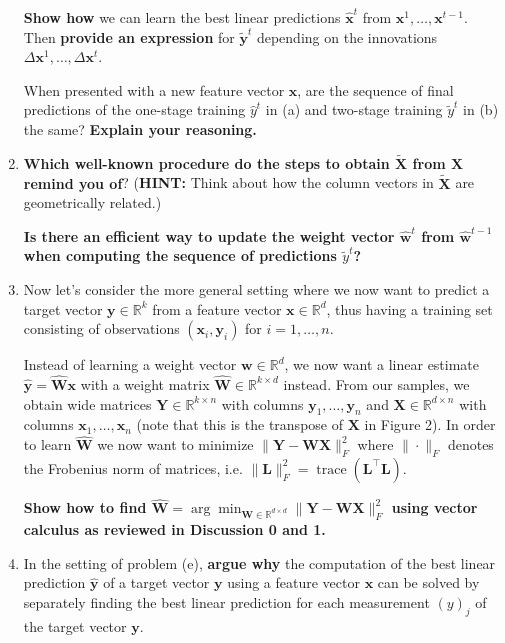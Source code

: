 \documentclass{article}\usepackage[utf8]{inputenc}\usepackage[margin=0.4cm,top=0.4cm,bottom=0.4cm]{geometry}\usepackage[usenames,dvipsnames,svgnames,table]{xcolor}
\begin{document}
\begin{enumerate}
\textbf{Show how} we can learn the best linear predictions $\hat{\mathbf{x}}^t$ from $\mathbf{x}^1,\ldots, \mathbf{x}^{t-1}$. Then \textbf{provide an expression} for $\tilde{\mathbf{y}}^t$ depending on the innovations $\Delta\mathbf{x}^1,\dots, \Delta\mathbf{x}^{t}$.
\vspace{3pt}

When presented with a new feature vector $\mathbf{x}$, are the sequence of final predictions of the one-stage training $\hat{y}^t$ in (a) and two-stage training $\tilde{y}^t$ in (b) the same?  \textbf{Explain your reasoning.}
\BeginSolution

\EndSolution
\item \textbf{Which well-known procedure do the steps to obtain $\tilde{\mathbf{X}}$ from $\mathbf{X}$ remind you of}? (\textbf{HINT: } Think about how the column vectors in $\tilde{\mathbf{X}}$ are geometrically related.)

\textbf{Is there an efficient way to update the weight vector $\hat{\mathbf{w}}^{t}$ from $\hat{\mathbf{w}}^{t-1}$ when computing the sequence of predictions $\tilde{y}^t$?}
\BeginSolution

\EndSolution
\item Now let's consider the more general setting where we now want to predict a target vector $\mathbf{y} \in \mathbb{R}^k$ from a feature vector $\mathbf{x} \in \mathbb{R}^d$, thus having a training set consisting of observations $(\mathbf{x}_i, \mathbf{y}_i)$ for $i=1,\ldots,n$.
\vspace{3pt}

Instead of learning a weight vector $\mathbf{w} \in \mathbb{R}^d$, we now want a linear estimate $\hat{\mathbf{y}} = \hat{\mathbf{W}} \mathbf{x}$ with a weight matrix $\hat{\mathbf{W}} \in \mathbb{R}^{k\times d}$ instead. From our samples, we obtain wide matrices $\mathbf{Y} \in \mathbb{R}^{k\times n}$ with columns $\mathbf{y}_1,\ldots,\mathbf{y}_n$ and $\mathbf{X} \in \mathbb{R}^{d\times n}$ with columns $\mathbf{x}_1, \ldots,\mathbf{x}_n$ (note that this is the transpose of $\mathbf{X}$ in Figure 2). In order to learn $\hat{\mathbf{W}}$ we now want to minimize $\|\mathbf{Y} - \mathbf{W}\mathbf{X}\|_F^2$ where $\|\cdot\|_F$ denotes the Frobenius norm of matrices, i.e. $\|\mathbf{L}\|_F^2 = \operatorname{trace}(\mathbf{L}^\top\mathbf{L})$.
\vspace{3pt}

\textbf{Show how to find $\hat{\mathbf{W}} = \arg\min_{\mathbf{W} \in \mathbb{R}^{d\times d}} \|\mathbf{Y} - \mathbf{W}\mathbf{X}\|_F^2$ using vector calculus as reviewed in Discussion 0 and 1.}
\BeginSolution

\EndSolution
\item In the setting of problem (e), \textbf{argue why} the computation of the best linear prediction $\hat{\mathbf{y}}$ of a target vector $\mathbf{y}$ using a feature vector $\mathbf{x}$ can be solved by separately finding the best linear prediction for each measurement $({y})_{j}$ of the target vector $\mathbf{y}$.
\BeginSolution

\EndSolution
\end{enumerate}
\clearpage
\end{document}
